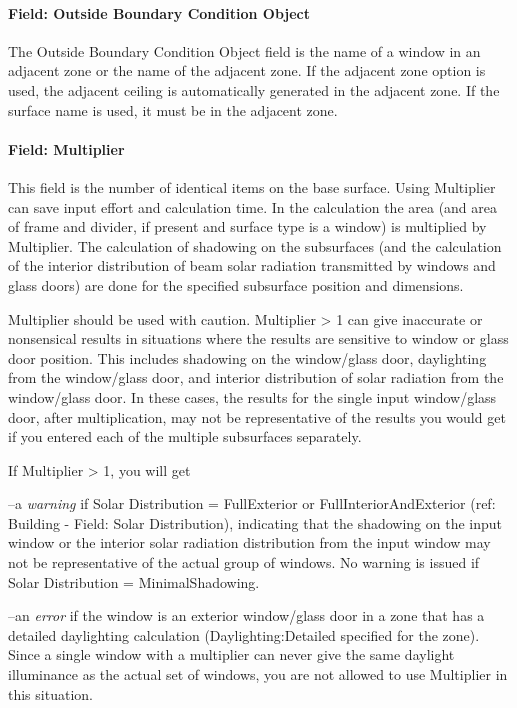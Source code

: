 \paragraph{Field: Outside Boundary Condition Object}\label{field-outside-boundary-condition-object-3}

The Outside Boundary Condition Object field is the name of a window in an adjacent zone or the name of the adjacent zone. If the adjacent zone option is used, the adjacent ceiling is automatically generated in the adjacent zone. If the surface name is used, it must be in the adjacent zone.

\paragraph{Field: Multiplier}\label{field-multiplier-4}

This field is the number of identical items on the base surface. Using Multiplier can save input effort and calculation time. In the calculation the area (and area of frame and divider, if present and surface type is a window) is multiplied by Multiplier. The calculation of shadowing on the subsurfaces (and the calculation of the interior distribution of beam solar radiation transmitted by windows and glass doors) are done for the specified subsurface position and dimensions.

Multiplier should be used with caution. Multiplier \textgreater{} 1 can give inaccurate or nonsensical results in situations where the results are sensitive to window or glass door position. This includes shadowing on the window/glass door, daylighting from the window/glass door, and interior distribution of solar radiation from the window/glass door. In these cases, the results for the single input window/glass door, after multiplication, may not be representative of the results you would get if you entered each of the multiple subsurfaces separately.

If Multiplier \textgreater{} 1, you will get

--a \emph{warning} if Solar Distribution = FullExterior or FullInteriorAndExterior (ref: Building - Field: Solar Distribution), indicating that the shadowing on the input window or the interior solar radiation distribution from the input window may not be representative of the actual group of windows. No warning is issued if Solar Distribution = MinimalShadowing.

--an \emph{error} if the window is an exterior window/glass door in a zone that has a detailed daylighting calculation (Daylighting:Detailed specified for the zone). Since a single window with a multiplier can never give the same daylight illuminance as the actual set of windows, you are not allowed to use Multiplier in this situation.

